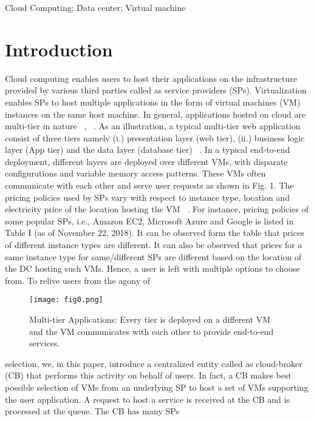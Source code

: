 \documentclass[conference]{IEEEtran}
\newcommand\tab[1][0.8cm]{\hspace*{#1}}
\begin{document}
\begin{IEEEkeywords}
Cloud Computing; Data center; Virtual machine
\end{IEEEkeywords}

\section{Introduction}

\tab Cloud computing enables users to host their applications
on the infrastructure provided by various third parties called
as service providers (SPs). Virtualization enables SPs to host
multiple applications in the form of virtual machines (VM)
instances on the same host machine. In general, applications
hosted on cloud are multi-tier in nature ~\cite{b1}, ~\cite{b2}. As an
illustration, a typical multi-tier web application consist of three
tiers namely (i.) presentation layer (web tier), (ii.) business
logic layer (App tier) and the data layer (database tier) ~\cite{b3}. In
a typical end-to-end deployment, different layers are deployed
over different VMs, with disparate configurations and variable
memory access patterns. These VMs often communicate with
each other and serve user requests as shown in Fig. 1.\newline
\tab
The pricing policies used by SPs vary with respect to
instance type, location and electricity price of the location
hosting the VM ~\cite{b4}. For instance, pricing policies of some
popular SPs, i.e., Amazon EC2, Microsoft Azure and Google
is listed in Table I (as of November 22, 2018). It can be
observed form the table that prices of different instance types
are different. It can also be observed that prices for a same
instance type for same/different SPs are different based on the
location of the DC hosting such VMs. Hence, a user is left
with multiple options to choose from. To relive users from the agony of 
\begin{figure}[htbp]
	\centerline{\texttt{[image: fig0.png]}}
	\caption{Multi-tier Applications: Every tier is deployed on a different VM and
		the VM communicates with each other to provide end-to-end services.}
	\label{fig}
\end{figure}
selection, we, in this paper, introduce a centralized
entity called as cloud-broker (CB) that performs this activity
on behalf of users. In fact, a CB makes best possible selection
of VMs from an underlying SP to host a set of VMs supporting
the user application. A request to host a service is received at
the CB and is processed at the queue. The CB has many SPs
\end{document}
